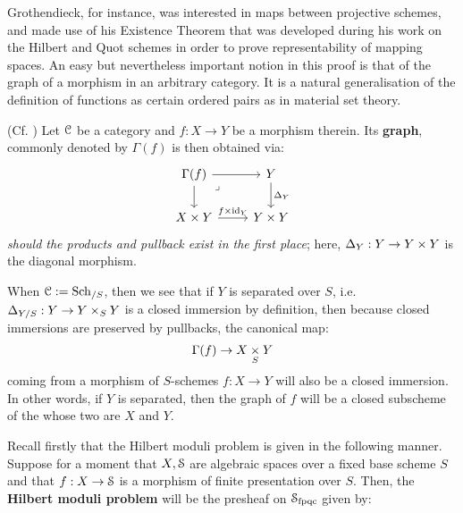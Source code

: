             Grothendieck, for instance, was interested in maps between projective schemes, and made use of his Existence Theorem that was developed during his work on the Hilbert and Quot schemes in order to prove representability of mapping spaces. An easy but nevertheless important notion in this proof is that of the graph of a morphism in an arbitrary category. It is a natural generalisation of the definition of functions as certain ordered pairs as in material set theory. 
            \begin{definition} \label{def: graphs_of_morphisms}
                (Cf. \cite[\href{https://stacks.math.columbia.edu/tag/024T}{Tag 024T}]{stacks}) Let $\mathcal{C}$ be a category and $f: X \to Y$ be a morphism therein. Its \textbf{graph}, commonly denoted by $\Gamma(f)$ is then obtained via:
                    $$
                        \begin{tikzcd}
                    	{\Gamma(f)} & Y \\
                    	{X \x Y} & {Y \x Y}
                    	\arrow[from=1-1, to=1-2]
                    	\arrow[from=1-1, to=2-1]
                    	\arrow["\lrcorner"{anchor=center, pos=0.125}, draw=none, from=1-1, to=2-2]
                    	\arrow["{\Delta_Y}", from=1-2, to=2-2]
                    	\arrow["{f \x \id_Y}", from=2-1, to=2-2]
                        \end{tikzcd}
                    $$
                \textit{should the products and pullback exist in the first place}; here, $\Delta_Y: Y \to Y \x Y$ is the diagonal morphism.
            \end{definition}
            \begin{remark}
                When $\mathcal{C} := \mathrm{Sch}_{/S}$, then we see that if $Y$ is separated over $S$, i.e. $\Delta_{Y/S}: Y \to Y \x_S Y$ is a closed immersion by definition, then because closed immersions are preserved by pullbacks, the canonical map:
                    $$\Gamma(f) \to X \x_S Y$$
                coming from a morphism of $S$-schemes $f: X \to Y$ will also be a closed immersion. In other words, if $Y$ is separated, then the graph of $f$ will be a closed subscheme of the  whose two  are $X$ and $Y$.
            \end{remark}
            Recall firstly that the Hilbert moduli problem is given in the following manner. Suppose for a moment that $X, \mathcal{S}$ are algebraic spaces over a fixed base scheme $S$ and that $f: X \to \mathcal{S}$ is a morphism of finite presentation over $S$. Then, the \textbf{Hilbert moduli problem} will be the presheaf on $\mathcal{S}_{\mathrm{fpqc}}$ given by:
